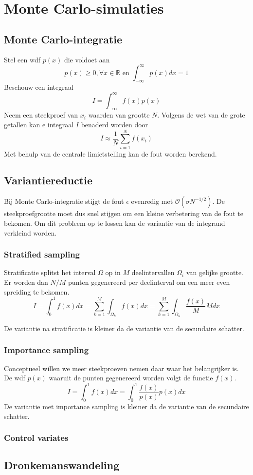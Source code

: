 \documentclass{article}
\begin{document}
	\section{Monte Carlo-simulaties}
	
	\subsection{Monte Carlo-integratie}
	
	Stel een wdf $p(x)$ die voldoet aan 
	$$
		p(x) \geq 0, \forall x \in \mathbb{R}
		\text{\ \ \ \ \ en \ \ \ \ \ }
		\int_{-\infty}^{\infty}p(x)dx=1
	$$
	Beschouw een integraal
	$$
		I = \int_{-\infty}^{\infty}f(x)p(x)
	$$
	Neem een steekproef van $x_i$ waarden van grootte $N$. Volgens de wet van de grote getallen kan e integraal $I$ benaderd worden door
	$$
		I \approx \frac{1}{N}\sum_{i=1}^{N}f(x_i)
	$$
	Met behulp van de centrale limietstelling kan de fout worden berekend.
	
	\subsection{Variantiereductie}
	
	Bij Monte Carlo-integratie stijgt de fout $\epsilon$ evenredig met $\mathcal{O}(\sigma N^{-1/2})$. De steekproefgrootte moet dus snel stijgen om een kleine verbetering van de fout te bekomen. Om dit probleem op te lossen kan de variantie van de integrand verkleind worden.
	
	\subsubsection{Stratified sampling}
	
	Stratificatie splitst het interval $\Omega$ op in $M$ deelintervallen $\Omega_i$ van gelijke grootte. Er worden dan $N/M$ punten gegenereerd per deelinterval om een meer even spreiding te bekomen.
	$$
		I =\int_{0}^{1}f(x)dx =  \sum_{k=1}^{M}\int_{\Omega_k}f(x)dx = \sum_{k=1}^{M}\int_{\Omega_k}\frac{f(x)}{M}Mdx
	$$
	
	De variantie na stratificatie is kleiner da de variantie van de secundaire schatter.
	
	\subsubsection{Importance sampling}
	
	Conceptueel willen we meer steekproeven nemen daar waar het belangrijker is. De wdf $p(x)$ waaruit de punten gegenereerd worden volgt de functie $f(x)$.
	$$
		I = \int_{0}^{1}f(x)dx = \int_{0}^{1}\frac{f(x)}{p(x)}p(x)dx
	$$
	De variantie met importance sampling is kleiner da de variantie van de secundaire schatter.
	
	\subsubsection{Control variates}
	
	
	
	\subsection{Dronkemanswandeling}
	
\end{document}
